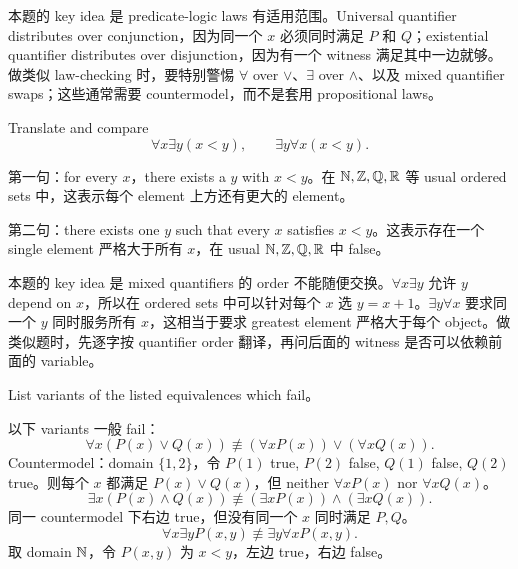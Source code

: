 \begin{explanation}
本题的 key idea 是 predicate-logic laws 有适用范围。Universal quantifier distributes over conjunction，因为同一个 \(x\) 必须同时满足 \(P\) 和 \(Q\)；existential quantifier distributes over disjunction，因为有一个 witness 满足其中一边就够。做类似 law-checking 时，要特别警惕 \(\forall\) over \(\lor\)、\(\exists\) over \(\land\)、以及 mixed quantifier swaps；这些通常需要 countermodel，而不是套用 propositional laws。
\end{explanation}

\begin{exerciseblock}
Translate and compare
\[
\forall x\exists y(x<y),\qquad \exists y\forall x(x<y).
\]
\end{exerciseblock}

\begin{solution}
第一句：for every \(x\)，there exists a \(y\) with \(x<y\)。在 \(\mathbb{N},\mathbb{Z},\mathbb{Q},\mathbb{R}\) 等 usual ordered sets 中，这表示每个 element 上方还有更大的 element。

第二句：there exists one \(y\) such that every \(x\) satisfies \(x<y\)。这表示存在一个 single element 严格大于所有 \(x\)，在 usual \(\mathbb{N},\mathbb{Z},\mathbb{Q},\mathbb{R}\) 中 false。
\end{solution}

\begin{explanation}
本题的 key idea 是 mixed quantifiers 的 order 不能随便交换。\(\forall x\exists y\) 允许 \(y\) depend on \(x\)，所以在 ordered sets 中可以针对每个 \(x\) 选 \(y=x+1\)。\(\exists y\forall x\) 要求同一个 \(y\) 同时服务所有 \(x\)，这相当于要求 greatest element 严格大于每个 object。做类似题时，先逐字按 quantifier order 翻译，再问后面的 witness 是否可以依赖前面的 variable。
\end{explanation}

\begin{exerciseblock}
List variants of the listed equivalences which fail。
\end{exerciseblock}

\begin{solution}
以下 variants 一般 fail：
\[
\forall x(P(x)\lor Q(x))\not\equiv(\forall xP(x))\lor(\forall xQ(x)).
\]
Countermodel：domain \(\{1,2\}\)，令 \(P(1)\) true, \(P(2)\) false, \(Q(1)\) false, \(Q(2)\) true。则每个 \(x\) 都满足 \(P(x)\lor Q(x)\)，但 neither \(\forall xP(x)\) nor \(\forall xQ(x)\)。
\[
\exists x(P(x)\land Q(x))\not\equiv(\exists xP(x))\land(\exists xQ(x)).
\]
同一 countermodel 下右边 true，但没有同一个 \(x\) 同时满足 \(P,Q\)。
\[
\forall x\exists yP(x,y)\not\equiv\exists y\forall xP(x,y).
\]
取 domain \(\mathbb{N}\)，令 \(P(x,y)\) 为 \(x<y\)，左边 true，右边 false。
\end{solution}


